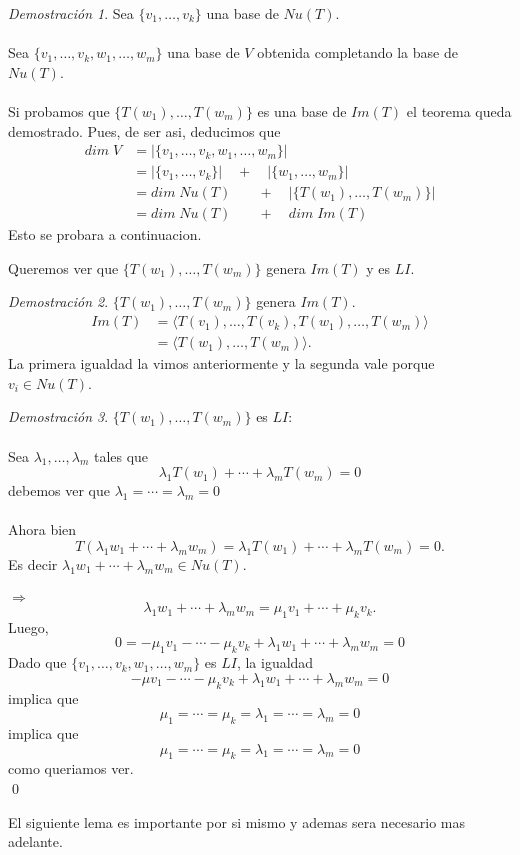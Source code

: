 \documentclass{article}
\theoremstyle{definition}
\theoremstyle{definition}
\theoremstyle{remark}
\newtheorem*{demo}{Demostración}
\begin{document}
  \begin{demo}
    Sea $\{v_1, \dots ,v_k\}$ una base de $Nu(T)$. \\\\ Sea $\{v_1, \dots ,v_k, w_1, \dots ,w_m\}$ una base de $V$ obtenida completando la base de $Nu(T)$. \\\\ Si probamos que $\{T(w_1), \dots ,T(w_m)\}$ es una base de $Im(T)$ el teorema queda demostrado. Pues, de ser asi, deducimos que \[
      \begin{aligned}
        dim \; V &= |\{v_1, \dots ,v_k, w_1, \dots ,w_m\} | \\
                 &= |\{v_1, \dots ,v_k\}| \quad + \quad |\{w_1, \dots ,w_m\}| \\
                 &= dim\;Nu(T) \quad \phantom{,,}+ \quad  |\{T(w_1),\dots ,T(w_m)\}| \\
                 &= dim \; Nu(T)\quad \phantom{,,} + \quad dim\; Im(T)
      \end{aligned}
    \]
    Esto se probara a continuacion.
  \end{demo}

Queremos ver que $\{T(w_1), \dots ,T(w_m)\}$ genera $Im(T)$ y es $LI$.\\
\begin{demo}$\{T(w_1), \dots ,T(w_m)\}$ genera $Im(T)$.
  \[
    \begin{aligned}
      Im(T) &= \langle T(v_1), \dots ,T(v_k), T(w_1), \dots ,T(w_m) \rangle  \\ 
            &= \langle T(w_1) , \dots ,T(w_m) \rangle . 
    \end{aligned}
  \]
  La primera igualdad la vimos anteriormente y la segunda vale porque \\ $v_i \in Nu(T)$. 
\end{demo}
\pagebreak 

\begin{demo} $\{T(w_1), \dots , T(w_m) \}$ es $LI$: \\\\ 
  Sea $\lambda_1, \dots ,\lambda_m$ tales que \[
\lambda_1 T (w_1 ) + \cdots + \lambda_m T(w_m) = 0 
  \]
  debemos ver que $\lambda_1 = \cdots = \lambda_m = 0$ \\\\
  Ahora bien \[
T(\lambda_1 w_1 + \cdots + \lambda_ m w_m )= \lambda_1 T(w_1) + \cdots + \lambda_m T(w_m) = 0.
  \]
Es decir $\lambda_1 w_1 + \cdots + \lambda_m w_m \in Nu(T)$. \\\\ 
$\Rightarrow$ \[
\lambda_1 w_1 + \cdots + \lambda_m w_m = \mu _1 v_1 + \cdots + \mu _k v_k.
\]
Luego, \[
0=-\mu_1v_1- \cdots - \mu_k v_k + \lambda_1 w_1 + \cdots + \lambda_m w_m = 0 
\]
Dado que $\{v_1, \dots ,v_k , w_1, \dots ,w_m\}$ es $LI$, la igualdad \[
-\mu v_1 - \cdots - \mu_k v_k + \lambda_1 w_1 + \cdots + \lambda_m w_m = 0
\]
implica que \[
\mu_1 = \cdots = \mu_k = \lambda_1 = \cdots = \lambda_m = 0
\]
implica que \[
\mu_1 = \cdots = \mu_k = \lambda_1 = \cdots = \lambda_m = 0
\]
como queriamos ver. \\ \qed
\end{demo}
El siguiente lema es importante por si mismo y ademas sera necesario mas adelante. \pagebreak
\end{document}
